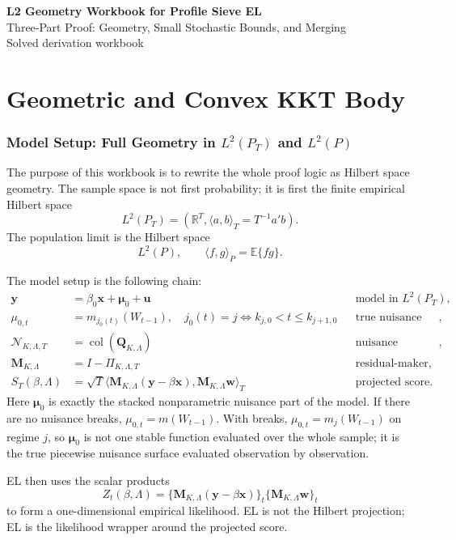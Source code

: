 \documentclass[12pt]{article}
\numberwithin{equation}{section}
\theoremstyle{definition}
\newcommand{\E}{\mathbb E}
\newcommand{\R}{\mathbb R}
\newcommand{\N}{\mathcal N}
\newcommand{\LtwoT}{L^2(P_T)}
\newcommand{\LtwoP}{L^2(P)}
\newcommand{\innerT}[2]{\langle #1,#2\rangle_T}
\newcommand{\innerP}[2]{\langle #1,#2\rangle_P}
\begin{document}
\begin{center}
{\Large\bf L2 Geometry Workbook for Profile Sieve EL}\\[6pt]
{\large Three-Part Proof: Geometry, Small Stochastic Bounds, and Merging}\\[6pt]
{\normalsize Solved derivation workbook}\\[12pt]
\end{center}

\tableofcontents
\newpage

\part{Geometric and Convex KKT Body}

\section{Model Setup: Full Geometry in \texorpdfstring{\(L^2(P_T)\)}{L2PT} and \texorpdfstring{\(L^2(P)\)}{L2P}}

The purpose of this workbook is to rewrite the whole proof logic as Hilbert
space geometry. The sample space is not first probability; it is first the
finite empirical Hilbert space
\[
    \LtwoT=(\R^T,\innerT{a}{b}=T^{-1}a'b).
\]
The population limit is the Hilbert space
\[
    \LtwoP,\qquad \innerP{f}{g}=\E\{fg\}.
\]

The model setup is the following chain:
\[
\begin{aligned}
\bm y&=\beta_0\bm x+\bm\mu_0+\bm u
&&\text{model in }\LtwoT,\\
\mu_{0,t}&=m_{j_0(t)}(W_{t-1}),\quad
j_0(t)=j\iff k_{j,0}<t\le k_{j+1,0}
&&\text{true nuisance vector},\\
\N_{K,\Lambda,T}&=\operatorname{col}(\bm Q_{K,\Lambda})
&&\text{nuisance subspace},\\
\bm M_{K,\Lambda}&=I-\Pi_{K,\Lambda,T}
&&\text{residual-maker},\\
S_T(\beta,\Lambda)&=\sqrt T\innerT{\bm M_{K,\Lambda}(\bm y-\beta\bm x)}
{\bm M_{K,\Lambda}\bm w}
&&\text{projected score}.
\end{aligned}
\]
Here \(\bm\mu_0\) is exactly the stacked nonparametric nuisance part of the
model. If there are no nuisance breaks, \(\mu_{0,t}=m(W_{t-1})\). With breaks,
\(\mu_{0,t}=m_j(W_{t-1})\) on regime \(j\), so \(\bm\mu_0\) is not one stable
function evaluated over the whole sample; it is the true piecewise nuisance
surface evaluated observation by observation.

EL then uses the scalar products
\[
    Z_t(\beta,\Lambda)
    =\{\bm M_{K,\Lambda}(\bm y-\beta\bm x)\}_t\{\bm M_{K,\Lambda}\bm w\}_t
\]
to form a one-dimensional empirical likelihood. EL is not the Hilbert
projection; EL is the likelihood wrapper around the projected score.
\end{document}
